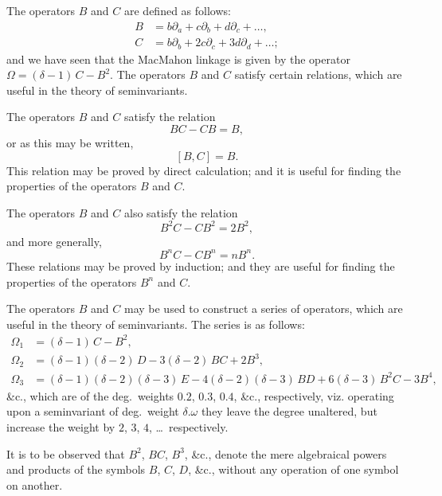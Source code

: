 \documentclass[11pt,a4paper]{book}
\begin{document}
\setcounter{art}{74}
\begin{art}
The operators $B$ and $C$ are defined as follows:
\begin{align*}
B &= b\partial_{a} + c\partial_{b} + d\partial_{c} + \ldots,\\
C &= b\partial_{b} + 2c\partial_{c} + 3d\partial_{d} + \ldots;
\end{align*}
and we have seen that the MacMahon linkage is given by the operator $\Omega = (\delta - 1)\,C - B^{2}$. The operators $B$ and $C$ satisfy certain relations, which are useful in the theory of seminvariants.
\end{art}

\setcounter{art}{75}
\begin{art}
The operators $B$ and $C$ satisfy the relation
\[
BC - CB = B,
\]
or as this may be written,
\[
[B, C] = B.
\]
This relation may be proved by direct calculation; and it is useful for finding the properties of the operators $B$ and $C$.
\end{art}

\setcounter{art}{76}
\begin{art}
The operators $B$ and $C$ also satisfy the relation
\[
B^{2}C - CB^{2} = 2B^{2},
\]
and more generally,
\[
B^{n}C - CB^{n} = nB^{n}.
\]
These relations may be proved by induction; and they are useful for finding the properties of the operators $B^{n}$ and $C$.
\end{art}

\setcounter{art}{77}
\begin{art}
The operators $B$ and $C$ may be used to construct a series of operators, which are useful in the theory of seminvariants. The series is as follows:
\begin{align*}
\Omega_{1} &= (\delta - 1)\,C - B^{2},\\
\Omega_{2} &= (\delta - 1)(\delta - 2)\,D - 3(\delta - 2)\,BC + 2B^{3},\\
\Omega_{3} &= (\delta - 1)(\delta - 2)(\delta - 3)\,E - 4(\delta - 2)(\delta - 3)\,BD + 6(\delta - 3)\,B^{2}C - 3B^{4},
\end{align*}
\&c., which are of the deg.~weights $0.2$, $0.3$, $0.4$, \&c., respectively, viz. operating upon a seminvariant of deg.~weight $\delta.\omega$ they leave the degree unaltered, but increase the weight by $2$, $3$, $4$, \ldots\ respectively.
\end{art}

\setcounter{art}{78}
\begin{art}
It is to be observed that $B^{2}$, $BC$, $B^{3}$, \&c., denote the mere algebraical powers and products of the symbols $B$, $C$, $D$, \&c., without any operation of one symbol on another.
\end{art}
\end{document}
